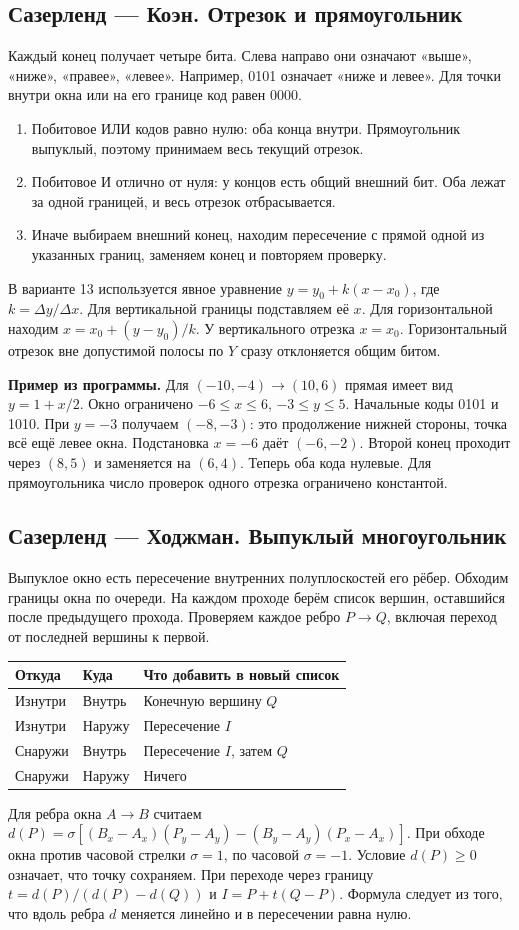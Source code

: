 \documentclass[11pt,a4paper]{extarticle}
\begin{document}
\subsection*{Сазерленд --- Коэн. Отрезок и прямоугольник}
Каждый конец получает четыре бита. Слева направо они означают «выше», «ниже», «правее», «левее». Например, 0101 означает «ниже и левее». Для точки внутри окна или на его границе код равен 0000.
\begin{enumerate}
\item Побитовое ИЛИ кодов равно нулю: оба конца внутри. Прямоугольник выпуклый, поэтому принимаем весь текущий отрезок.
\item Побитовое И отлично от нуля: у концов есть общий внешний бит. Оба лежат за одной границей, и весь отрезок отбрасывается.
\item Иначе выбираем внешний конец, находим пересечение с прямой одной из указанных границ, заменяем конец и повторяем проверку.
\end{enumerate}
В варианте 13 используется явное уравнение $y=y_0+k(x-x_0)$, где $k=\Delta y/\Delta x$. Для вертикальной границы подставляем её $x$. Для горизонтальной находим $x=x_0+(y-y_0)/k$. У вертикального отрезка $x=x_0$. Горизонтальный отрезок вне допустимой полосы по $Y$ сразу отклоняется общим битом.

\textbf{Пример из программы.} Для $(-10,-4)\to(10,6)$ прямая имеет вид $y=1+x/2$. Окно ограничено $-6\le x\le6$, $-3\le y\le5$. Начальные коды 0101 и 1010. При $y=-3$ получаем $(-8,-3)$: это продолжение нижней стороны, точка всё ещё левее окна. Подстановка $x=-6$ даёт $(-6,-2)$. Второй конец проходит через $(8,5)$ и заменяется на $(6,4)$. Теперь оба кода нулевые. Для прямоугольника число проверок одного отрезка ограничено константой.
\subsection*{Сазерленд --- Ходжман. Выпуклый многоугольник}
Выпуклое окно есть пересечение внутренних полуплоскостей его рёбер. Обходим границы окна по очереди. На каждом проходе берём список вершин, оставшийся после предыдущего прохода. Проверяем каждое ребро $P\to Q$, включая переход от последней вершины к первой.
\begin{center}\begin{tabular}{lll}\toprule
Откуда & Куда & Что добавить в новый список\\\midrule
Изнутри & Внутрь & Конечную вершину $Q$\\
Изнутри & Наружу & Пересечение $I$\\
Снаружи & Внутрь & Пересечение $I$, затем $Q$\\
Снаружи & Наружу & Ничего\\\bottomrule\end{tabular}\end{center}
Для ребра окна $A\to B$ считаем $d(P)=\sigma[(B_x-A_x)(P_y-A_y)-(B_y-A_y)(P_x-A_x)]$. При обходе окна против часовой стрелки $\sigma=1$, по часовой $\sigma=-1$. Условие $d(P)\ge0$ означает, что точку сохраняем. При переходе через границу $t=d(P)/(d(P)-d(Q))$ и $I=P+t(Q-P)$. Формула следует из того, что вдоль ребра $d$ меняется линейно и в пересечении равна нулю.
\end{document}
